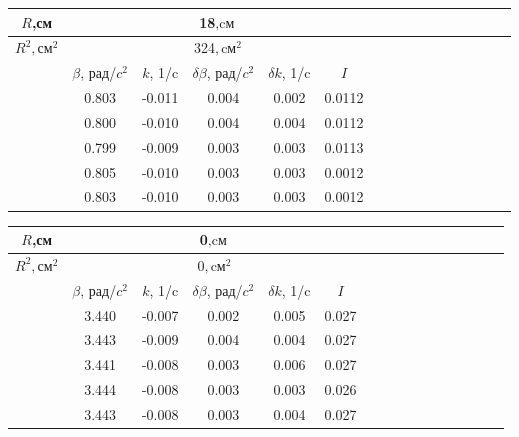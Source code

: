 \documentclass[14pt]{article}
\begin{document}
\begin{center}
\begin{tabular}{|c|c|c|c|c|c|c|c|c|c|c|c|c|c|c|c|}
\hline
$R$,см	&	\multicolumn{5}{|c|}{18$, \text{cм}$}			\\
\hline
$R^2, \text{см}^2$	&	\multicolumn{5}{|c|}{324$, \text{cм}^2$}			\\
\hline
		&	$\beta$, рад/$c^2$	&	$k$, 1/c	&	$\delta\beta$, рад/$c^2$	&	$\delta k$, 1/c		&	$I$		\\
\hline
		&	0.803				&	-0.011		&	0.004						&	0.002				&	0.0112	\\
\hline
		&	0.800				&	-0.010		&	0.004						&	0.004				&	0.0112	\\
\hline
		&	0.799				&	-0.009		&	0.003						&	0.003				&	0.0113	\\
\hline
		&	0.805				&	-0.010		&	0.003						&	0.003				&	0.0012	\\
\hline
		&	0.803				&	-0.010		&	0.003						&	0.003				&	0.0012	\\
\hline
\end{tabular}
\end{center}

\begin{center}
\begin{tabular}{|c|c|c|c|c|c|c|c|c|c|c|c|c|c|c|c|}
\hline
$R$,см	&	\multicolumn{5}{|c|}{0$, \text{cм}$}			\\
\hline
$R^2, \text{см}^2$	&	\multicolumn{5}{|c|}{0$, \text{cм}^2$}			\\
\hline
		&	$\beta$, рад/$c^2$	&	$k$, 1/c	&	$\delta\beta$, рад/$c^2$	&	$\delta k$, 1/c		&	$I$		\\
\hline
		&	3.440				&	-0.007		&	0.002						&	0.005				&	0.027	\\
\hline
		&	3.443				&	-0.009		&	0.004						&	0.004				&	0.027	\\
\hline
		&	3.441				&	-0.008		&	0.003						&	0.006				&	0.027	\\
\hline
		&	3.444				&	-0.008		&	0.003						&	0.003				&	0.026	\\
\hline
		&	3.443				&	-0.008		&	0.003						&	0.004				&	0.027	\\
\hline
\end{tabular}
\end{center}

\vspace{1cm}
\begin{flushleft}
\end{flushleft}
\end{document}
